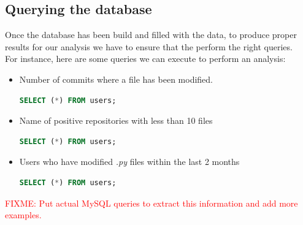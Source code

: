 \documentclass[a4paper, 12pt]{book}
\begin{document}
\subsection{Querying the database}
\label{ssec:query-database}
Once the database has been build and filled with the data, to produce proper results for our analysis we have to ensure
that the perform the right queries.\\
For instance, here are some queries we can execute to perform an analysis:
\begin{itemize}
  \item Number of commits where a file has been modified.
  \begin{lstlisting}[language=SQL]
  SELECT (*) FROM users; \end{lstlisting}
  \item Name of positive repositories with less than 10 files
  \begin{lstlisting}[language=SQL]
  SELECT (*) FROM users; \end{lstlisting}
  \item Users who have modified \emph{.py} files within the last 2 months
  \begin{lstlisting}[language=SQL]
  SELECT (*) FROM users; \end{lstlisting}
\end{itemize}
\textcolor{red}{FIXME: Put actual MySQL queries to extract this information and add more examples.}
\cleardoublepage
\end{document}
